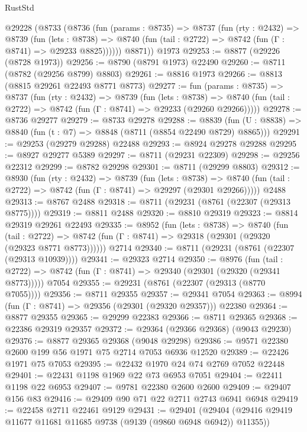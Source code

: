 \begin{lexlean}{RustStd}
\begin{coremodule}
    @29228
      (@8733
        (@8736
          (fun (params : @8735) =>
          @8737
            (fun (rty : @2432) =>
            @8739
              (fun (lets : @8738) =>
              @8740 (fun (tail : @2722) => @8742 (fun (Γ : @8741) => @29233 @8825))))))
        @8871))
    @1973
@29253 := @8877 (@29226 (@8728 @1973))
@29256 := @8790 (@8791 @1973) @22490
@29260 := @8711 (@8782 (@29256 @8799) @8803)
@29261 := @8816 @1973
@29266 := @8813 (@8815 @29261 @22493 @8771 @8773)
@29277 := fun (params : @8735) =>
  @8737
    (fun (rty : @2432) =>
    @8739
      (fun (lets : @8738) =>
      @8740 (fun (tail : @2722) => @8742 (fun (Γ : @8741) => @29233 (@29260 @29266)))))
@29278 := @8736 @29277
@29279 := @8733 @29278
@29288 := @8839
    (fun (U : @8838) => @8840 (fun (t : @7) => @8848 (@8711 (@8854 @22490 @8729) @8865)))
@29291 := @29253 (@29279 @29288) @22488
@29293 := @8924 @29278 @29288
@29295 := @8927 @29277 @5389
@29297 := @8711 (@29231 @22309)
@29298 := @29256 @22312
@29299 := @8782 @29298
@29301 := @8711 (@29299 @8803)
@29312 := @8930
    (fun (rty : @2432) =>
    @8739
      (fun (lets : @8738) =>
      @8740 (fun (tail : @2722) => @8742 (fun (Γ : @8741) => @29297 (@29301 @29266)))))
    @2488
@29313 := @8767 @2488
@29318 := @8711 (@29231 (@8761 (@22307 (@29313 @8775))))
@29319 := @8811 @2488
@29320 := @8810 @29319
@29323 := @8814 @29319 @29261 @22493
@29335 := @8952
    (fun (lets : @8738) =>
    @8740
      (fun (tail : @2722) =>
      @8742 (fun (Γ : @8741) => @29318 (@29301 (@29320 (@29323 @8771 @8773))))))
    @2714
@29340 := @8711 (@29231 (@8761 (@22307 (@29313 @10939))))
@29341 := @29323 @2714
@29350 := @8976
    (fun (tail : @2722) => @8742 (fun (Γ : @8741) => @29340 (@29301 (@29320 (@29341 @8773)))))
    @7054
@29355 := @29231 (@8761 (@22307 (@29313 (@8770 @7055))))
@29356 := @8711 @29355
@29357 := @29341 @7054
@29363 := @8994 (fun (Γ : @8741) => @29356 (@29301 (@29320 @29357))) @22380
@29364 := @8877 @29355
@29365 := @29299 @22383
@29366 := @8711 @29365
@29368 := @22386 @29319 @29357
@29372 := @29364 (@29366 @29368) (@9043 @29230)
@29376 := @8877 @29365 @29368 (@9048 @29298)
@29386 := @9571 @22380 @2600 @199 @56 @1971 @75 @2714 @7053 @6936 @12520
@29389 := @22426 @1971 @75 @7053
@29395 := @22432 @1970 @24 @74 @2769 @7052 @22448
@29401 := @22431 @1198 @1969 @22 @73 @6953 @7051
@29404 := @22411 @1198 @22 @6953
@29407 := @9781 @22380 @2600 @2600
@29409 := @29407 @156 @83
@29416 := @29409 @90 @71 @22 @2711 @2743 @6941 @6948
@29419 := @22458 @2711 @22461 @9129
@29431 := @29401
    (@29404 (@29416 @29419 @11677 @11681 @11685 @9738 (@9139 (@9860 @6948 @6942)) @11355))

\end{coremodule}
\end{lexlean}
